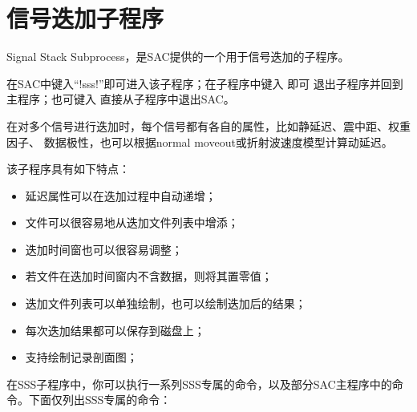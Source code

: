 \section{信号迭加子程序}
Signal Stack Subprocess，是SAC提供的一个用于信号迭加的子程序。

在SAC中键入``!sss!''即可进入该子程序；在子程序中键入  即可
退出子程序并回到主程序；也可键入  直接从子程序中退出SAC。

在对多个信号进行迭加时，每个信号都有各自的属性，比如静延迟、震中距、权重因子、
数据极性，也可以根据normal moveout或折射波速度模型计算动延迟。

该子程序具有如下特点：
\begin{itemize}
\item 延迟属性可以在迭加过程中自动递增；
\item 文件可以很容易地从迭加文件列表中增添；
\item 迭加时间窗也可以很容易调整；
\item 若文件在迭加时间窗内不含数据，则将其置零值；
\item 迭加文件列表可以单独绘制，也可以绘制迭加后的结果；
\item 每次迭加结果都可以保存到磁盘上；
\item 支持绘制记录剖面图；
\end{itemize}

在SSS子程序中，你可以执行一系列SSS专属的命令，以及部分SAC主程序中的命令。下面仅列出SSS专属的命令：

